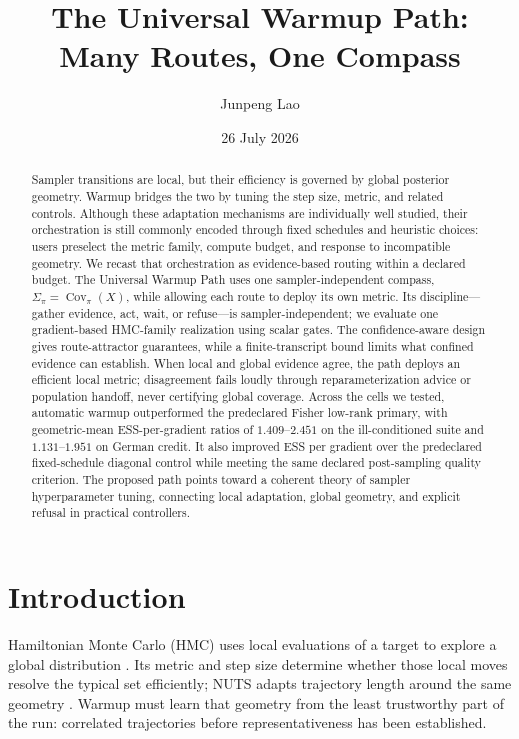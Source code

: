 \documentclass[11pt]{article}
\title{\textbf{The Universal Warmup Path:\\[2pt]
Many Routes, One Compass}}
\author{Junpeng Lao}
\date{26 July 2026}
\theoremstyle{plain}
\theoremstyle{definition}
\theoremstyle{remark}
\begin{document}
\maketitle

\begin{abstract}\noindent
Sampler transitions are local, but their efficiency is governed by global
posterior geometry. Warmup bridges the two by tuning the step size, metric, and
related controls. Although these adaptation mechanisms are individually well
studied, their orchestration is still commonly encoded through fixed schedules
and heuristic choices: users preselect the metric family, compute budget, and
response to incompatible geometry. We recast that orchestration as
evidence-based routing within a declared budget. The Universal Warmup Path uses
one sampler-independent compass, $\Sigma_\pi=\operatorname{Cov}_\pi(X)$, while
allowing each route to deploy its own metric. Its discipline---gather evidence,
act, wait, or refuse---is sampler-independent; we evaluate one gradient-based
HMC-family realization using scalar gates. The confidence-aware design gives
route-attractor guarantees, while a finite-transcript bound limits what
confined evidence can establish. When local and global evidence agree, the path
deploys an efficient local metric; disagreement fails loudly through
reparameterization advice or population handoff, never certifying global
coverage. Across the cells we tested, automatic warmup outperformed the
predeclared Fisher low-rank primary, with geometric-mean ESS-per-gradient
ratios of $1.409$--$2.451$ on the ill-conditioned suite and $1.131$--$1.951$ on
German credit. It also improved ESS per gradient over the predeclared
fixed-schedule diagonal control while meeting the same declared post-sampling
quality criterion. The proposed path points toward a coherent theory of sampler
hyperparameter tuning, connecting local adaptation, global geometry, and
explicit refusal in practical controllers.
\end{abstract}

\section{Introduction}\label{sec:intro}

Hamiltonian Monte Carlo (HMC) uses local evaluations of a target to explore a
global distribution \citep{duane1987hybrid,neal2011mcmc}. Its metric and step
size determine whether those local moves resolve the typical set efficiently;
NUTS adapts trajectory length around the same geometry
\citep{hoffman2014nuts}. Warmup must learn that geometry from the least
trustworthy part of the run: correlated trajectories before representativeness
has been established.
\end{document}
